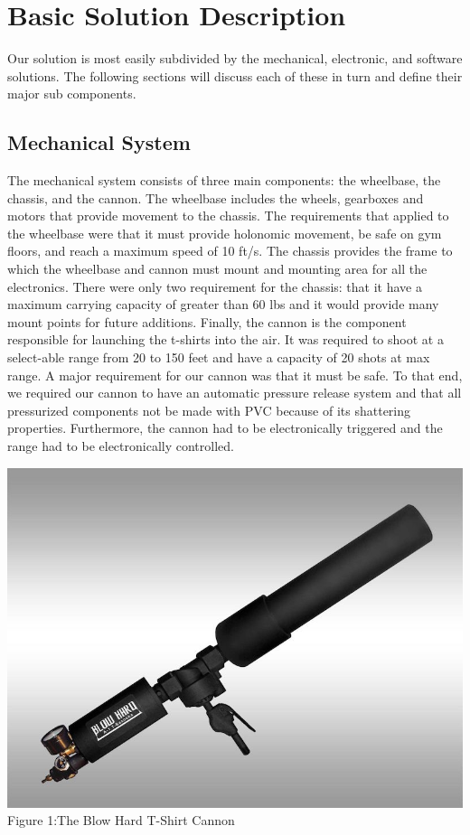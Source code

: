 \documentclass[letterpaper,12pt]{article}
\begin{document}
\section{Basic Solution Description}
\label{sec:basicsoldesc}

Our solution is most easily subdivided by the mechanical, electronic, and software solutions. The following sections will discuss each of these in turn and define their major sub components. 

\subsection{Mechanical System}
The mechanical system consists of three main components: the wheelbase, the chassis, and the cannon. The wheelbase includes the wheels, gearboxes and motors that provide movement to the chassis. The requirements that applied to the wheelbase were that it must provide holonomic movement, be safe on gym floors, and reach a maximum speed of 10 ft/s. The chassis provides the frame to which the wheelbase and cannon must mount and mounting area for all the electronics. There were only two requirement for the chassis: that it have a maximum carrying capacity of greater than 60 lbs and it would provide many mount points for future additions. Finally, the cannon is the component responsible for launching the t-shirts into the air. It was required to shoot at a select-able range from 20 to 150 feet and have a capacity of 20 shots at max range. A major requirement for our cannon was that it must be safe. To that end, we required our cannon to have an automatic pressure release system and that all pressurized components not be made with PVC because of its shattering properties. Furthermore, the cannon had to be electronically triggered and the range had to be electronically controlled. 

\begin{center}
    \includegraphics[width=15cm]{./pics/cannon/blowhard_cannon.jpg}\\
     Figure 1:The Blow Hard T-Shirt Cannon
\end{center}
\end{document}
